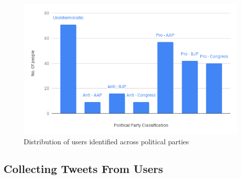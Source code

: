 \documentclass[a4paper,11pt]{article}
\begin{document}
\begin{figure}
\includegraphics[width=\linewidth]{chart.png}
\caption{Distribution of users identified across political parties}
\label{fig:partyDistribution}
\end{figure}

\subsection{Collecting Tweets From Users}
\end{document}
